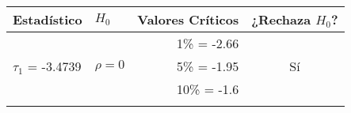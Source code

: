 \begin{table}[ht]
\begin{tabular}{llrc}
	\cline{1-2}
		Estadístico    			& $H_0$ 							& Valores Críticos 	& ¿Rechaza $H_0$? \\
		\hline
	\cline{1-4}				
							&								& 1\%   = -2.66		&			\\
		 $\tau_1$ = -3.4739		& $\rho=0$						& 5\%   = -1.95		&       Sí		\\
							&  								& 10\% = -1.6		&       		\\
	
							
	\lasthline
	\end{tabular}
\label{table:IPIBCTE}
\end{table}






